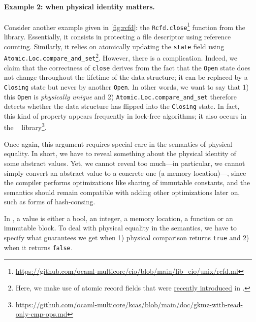 \paragraph{Example 2: when physical identity matters.}

Consider another example given in \cref{fig:rcfd}: the \texttt{Rcfd.close}\footnote{\url{https://github.com/ocaml-multicore/eio/blob/main/lib_eio/unix/rcfd.ml}} function from the \Eio~\cite{eio} library.
Essentially, it consists in protecting a file descriptor using reference counting.
Similarly, it relies on atomically updating the \texttt{state} field using \texttt{Atomic.Loc.compare_and_set}\footnote{Here, we make use of atomic record fields that were \href{https://github.com/ocaml/ocaml/pull/13404}{recently introduced} in \OCaml.}.
However, there is a complication.
Indeed, we claim that the correctness of \texttt{close} derives from the fact that the \texttt{Open} state does not change throughout the lifetime of the data structure; it can be replaced by a \texttt{Closing} state but never by another \texttt{Open}.
In other words, we want to say that 1) this \texttt{Open} is \emph{physically unique} and 2) \texttt{Atomic.Loc.compare_and_set} therefore detects whether the data structure has flipped into the \texttt{Closing} state.
In fact, this kind of property appears frequently in lock-free algorithms; it also occurs in the \Kcas~\cite{kcas} library\footnote{\url{https://github.com/ocaml-multicore/kcas/blob/main/doc/gkmz-with-read-only-cmp-ops.md}}.

Once again, this argument requires special care in the semantics of physical equality.
In short, we have to reveal something about the physical identity of some abstract values.
Yet, we cannot reveal too much---in particular, we cannot simply convert an abstract value to a concrete one (a memory location)---, since the \OCaml compiler performs optimizations like sharing of immutable constants, and the semantics should remain compatible with adding other optimizations later on, such as forms of hash-consing.


In \Zoo, a value is either a bool, an integer, a memory location, a function or an immutable block.
To deal with physical equality in the semantics, we have to specify what guarantees we get when 1) physical comparison returns \texttt{true} and 2) when it returns \texttt{false}.


